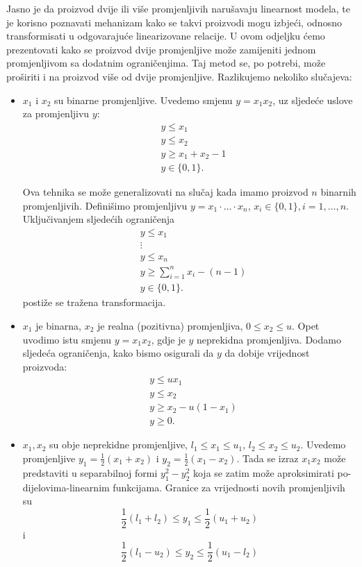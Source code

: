 \documentclass[a4paper, utf8, 11pt, colorlinks]{book}
\theoremstyle{definition}
\begin{document}
 Jasno je da proizvod dvije ili više promjenljivih narušavaju linearnost modela, te je korisno poznavati mehanizam kako se takvi proizvodi mogu izbjeći, odnosno transformisati u odgovarajuće linearizovane relacije. U ovom odjeljku ćemo prezentovati kako se proizvod dvije promjenljive može zamijeniti jednom promjenljivom  sa dodatnim ograničenjima. Taj metod se, po potrebi, može proširiti i na proizvod više od dvije promjenljive. Razlikujemo nekoliko slučajeva:
 \begin{itemize}
 	\item $x_1$ i $x_2$ su binarne promjenljive. Uvedemo smjenu $y=x_1 x_2$, uz sljedeće uslove za promjenljivu $y$:
 	  \begin{align*}
 		      &y \leq x_1 \\
 		      &y \leq x_2 \\
 		      & y \geq x_1 + x_2 - 1 \\
 		      & y \in \{0, 1\}.
 	  \end{align*}
   
 Ova tehnika se može generalizovati na slučaj kada imamo proizvod $n$ binarnih promjenljivih. Definišimo promjenljivu  $y = x_1 \cdot \ldots \cdot x_n$, $x_i\in\{0,1\}, i=1,\ldots ,n$. Uključivanjem sljedećih ograničenja 
   \begin{align*}
   	&y \leq x_1 \\
   	& \vdots \\
   	&y \leq x_n \\
   	& y \geq \sum_{i=1}^n x_i - (n-1) \\
   	& y \in \{0, 1\}.
   \end{align*}
postiže se tražena transformacija.

   \item $x_1$ je binarna, $x_2$ je realna (pozitivna) promjenljiva, $0 \leq x_2 \leq u$. Opet uvodimo istu smjenu $y= x_1 x_2$, gdje je $y$ neprekidna promjenljiva. Dodamo sljedeća ograničenja, kako bismo osigurali da $y$ da dobije vrijednost proizvoda:
    \begin{align*}
    	 &y \leq u x_1 \\
    	 &y \leq x_2 \\
    	 & y \geq x_2 - u(1-x_1) \\
    	 & y \geq 0.
    \end{align*}
 
  \item $x_1, x_2$ su obje neprekidne promjenljive, $l_1 \leq x_1 \leq u_1$, $l_2 \leq x_2 \leq u_2$. Uvedemo promjenljive $y_1 = \frac{1}{2}( x_1 + x_2) $ i  $y_2 =\frac{1}{2}(x_1 - x_2)$. Tada se izraz $x_1x_2$ može predstaviti u separabilnoj formi $y_1^2 - y_2^2$ koja se zatim može aproksimirati po-dijelovima-linearnim funkcijama. Granice za vrijednosti novih promjenljivih su 
  $$ \frac{1}{2}(l_1 + l_2) \leq y_1 \leq \frac{1}{2}(u_1 + u_2)$$ i 
  $$ \frac{1}{2}(l_1 - u_2) \leq y_2 \leq \frac{1}{2}(u_1 - l_2) $$
  
 \end{itemize} 
\end{document}
